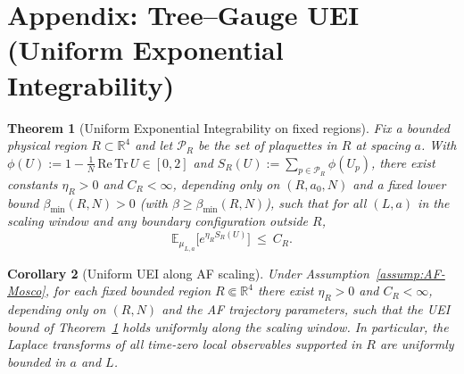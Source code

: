 \documentclass[11pt]{amsart}
\theoremstyle{plain}
\newtheorem{theorem}{Theorem}[section]
\newtheorem{corollary}[theorem]{Corollary}
\theoremstyle{definition}
\theoremstyle{remark}
\renewcommand{\tfrac}[2]{\textstyle\frac{#1}{#2}}
\begin{document}
\section{Appendix: Tree--Gauge UEI (Uniform Exponential Integrability)}

\begin{theorem}[Uniform Exponential Integrability on fixed regions]\label{thm:uei-fixed-region}
Fix a bounded physical region $R\subset\mathbb{R}^4$ and let $\mathcal{P}_R$ be the set of plaquettes in $R$ at spacing $a$. With $\phi(U):=1-\tfrac{1}{N}\,\mathrm{Re\,Tr}\,U\in[0,2]$ and $S_R(U):=\sum_{p\in\mathcal{P}_R}\phi(U_p)$, there exist constants $\eta_R>0$ and $C_R<\infty$, depending only on $(R,a_0,N)$ and a fixed lower bound $\beta_{\min}(R,N)>0$ (with $\beta\ge \beta_{\min}(R,N)$), such that for all $(L,a)$ in the scaling window and any boundary configuration outside $R$,
\[
  \mathbb{E}_{\mu_{L,a}}\big[e^{\eta_R S_R(U)}\big]\ \le\ C_R.
\]
\end{theorem}
\begin{corollary}[Uniform UEI along AF scaling]\label{cor:uei-af-uniform}
Under Assumption~\ref{assump:AF-Mosco}, for each fixed bounded region $R\Subset\mathbb R^4$ there exist $\eta_R>0$ and $C_R<\infty$, depending only on $(R,N)$ and the AF trajectory parameters, such that the UEI bound of Theorem~\ref{thm:uei-fixed-region} holds uniformly along the scaling window. In particular, the Laplace transforms of all time-zero local observables supported in $R$ are uniformly bounded in $a$ and $L$.
\end{corollary}
\end{document}
